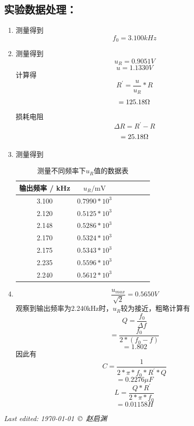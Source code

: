 \documentclass[a4paper,11pt]{article}
\begin{document}
\begin{appendix}
    \subsection{实验数据处理：} 
    \begin{enumerate}
    	\item  测量得到$$ f_{0} = 3.100 kHz $$
    	\item 测量得到$$u_{R} = 0.9051 V$$
    	$$u = 1.1330 V$$
    	计算得$$R^{\prime} = \dfrac{u}{u_{R}} * R$$
    	$$ = 125.18 \ohm$$
    	损耗电阻
    	$$ \Delta R = R^{\prime} - R$$
    	$$ = 25.18 \ohm$$
    	\item 测量得到
    	\begin{table}[H]
    		\centering\caption{测量不同频率下$ u_{R}$值的数据表}
    		\small
    		\begin{tabularx}{.85\linewidth}{C{1} *6{C{.8}}}
    			\toprule
    			输出频率 / \si{\kHz} &
    			$u_{R}  / \si{\mV}$ &\\
    			  & $0.7990 * 10^{3}$   \\
    			2.120  & $0.5125 * 10^{3}$   \\
    			2.148  & $0.5286 * 10^{3}$   \\
    			2.170  & $0.5324 * 10^{3}$   \\
    			2.175  & $0.5343 * 10^{3}$    \\
    			2.235  & $0.5596 * 10^{3}$    \\
    			2.240  & $0.5612 * 10^{3}$    \\
    			\bottomrule
    		\end{tabularx}
    		\vspace{3ex}
    	\end{table}\noindent%
    	\item $$\dfrac{u_{max}}{\sqrt{2}} = 0.5650 V$$ 
    	观察到输出频率为2.240kHz时，$u_{R}$较为接近，粗略计算有
    	$$ Q = \dfrac{f_{0}}{\Delta f} $$
    	$$  = \dfrac{f_{0}}{2 * (f_{0} - f)} $$
    	$$  = 1.802 $$
    	因此有
    	$$ C = \dfrac{1}{2 * \pi * f_{0} * R^{\prime} * Q} $$
    	$$  = 0.2276 \mu F  $$
    	$$ L = \dfrac{Q * R^{\prime}}{2 * \pi * f_{0} } $$
    	$$  = 0.01158 H  $$
    \end{enumerate}    
\end{appendix}

	\vfill\noindent\itshape\footnotesize
	\hfill Last edited: \today\ \copyright\ 赵启渊
\end{document}
